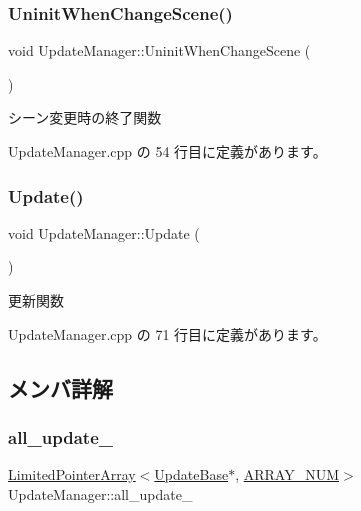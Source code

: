 \subsubsection{\texorpdfstring{Uninit\+When\+Change\+Scene()}{UninitWhenChangeScene()}}
{\footnotesize\ttfamily void Update\+Manager\+::\+Uninit\+When\+Change\+Scene (\begin{DoxyParamCaption}{ }\end{DoxyParamCaption})}



シーン変更時の終了関数 



 Update\+Manager.\+cpp の 54 行目に定義があります。

\mbox{\label{class_update_manager_ac4bdd39d106c7e6b505fe9a0c55e50de}} 
\subsubsection{\texorpdfstring{Update()}{Update()}}
{\footnotesize\ttfamily void Update\+Manager\+::\+Update (\begin{DoxyParamCaption}{ }\end{DoxyParamCaption})}



更新関数 



 Update\+Manager.\+cpp の 71 行目に定義があります。



\subsection{メンバ詳解}
\mbox{\label{class_update_manager_a1e22347205a91812355ccb0b61538754}} 
\subsubsection{\texorpdfstring{all\+\_\+update\+\_\+}{all\_update\_}}
{\footnotesize\ttfamily \mbox{\hyperlink{class_limited_pointer_array}{Limited\+Pointer\+Array}}$<$\mbox{\hyperlink{class_update_base}{Update\+Base}}$\ast$, \mbox{\hyperlink{class_update_manager_a280b884fb6a025cfd92d4f93086c60c6}{A\+R\+R\+A\+Y\+\_\+\+N\+UM}}$>$ Update\+Manager\+::all\+\_\+update\+\_\+\hspace{0.3cm}{\ttfamily [private]}}



